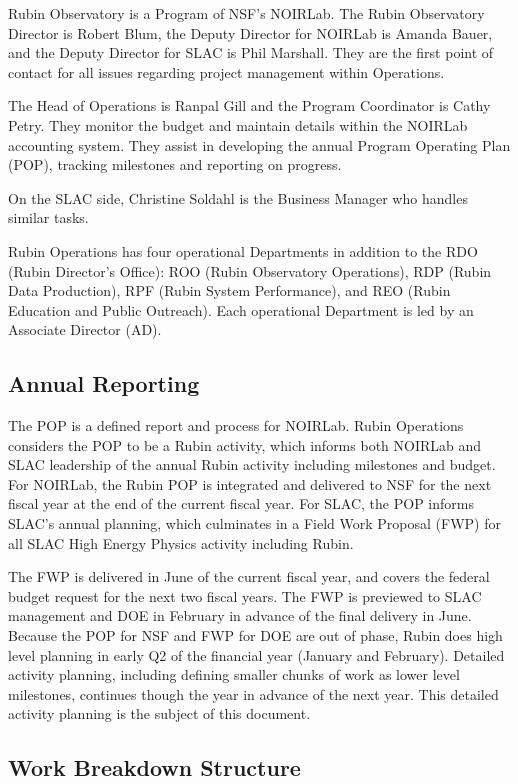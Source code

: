 Rubin Observatory is a Program of NSF's NOIRLab.
The Rubin Observatory \gls{Director} is Robert Blum, the Deputy \gls{Director} for NOIRLab is Amanda Bauer, and the Deputy \gls{Director} for SLAC is Phil Marshall.
They are the first point of contact for all issues regarding project management within \RO Operations.

The Head of Operations is Ranpal Gill and the Program Coordinator is Cathy Petry.
They monitor the budget and maintain details within the NOIRLab accounting system.
They assist in developing the annual Program Operating Plan (POP), tracking milestones and reporting on progress.

On the SLAC side, Christine Soldahl is the Business Manager who handles similar tasks.

Rubin Operations has four operational Departments in addition to the RDO (Rubin Director’s Office): ROO (Rubin Observatory Operations), RDP (Rubin Data Production), RPF (Rubin System Performance), and REO (Rubin Education and Public Outreach).
Each operational Department is led by an Associate Director (AD).

\subsection{Annual Reporting}
\label{sec:reporting}

The POP is a defined report and process for NOIRLab.
Rubin Operations considers the POP to be a Rubin activity, which informs both NOIRLab and SLAC leadership of the annual Rubin activity including milestones and budget.
For NOIRLab, the Rubin POP is integrated and delivered to NSF for the next fiscal year at the end of the current fiscal year.
For SLAC, the POP informs SLAC's annual planning, which culminates in a Field Work Proposal (FWP) for all SLAC High Energy Physics activity including Rubin.

The FWP is delivered in June of the current fiscal year, and covers the federal budget request for the next two fiscal years.
The FWP is previewed to SLAC management and DOE in February in advance of the final delivery in June.
Because the POP for NSF and FWP for DOE are out of phase, Rubin does high level planning in early Q2 of the financial year (January and February).
Detailed activity planning, including defining smaller chunks of work as lower level milestones, continues though the year in advance of the next year.
This detailed activity planning is the subject of this document.

\subsection{Work Breakdown Structure}
\label{sec:wbs}

